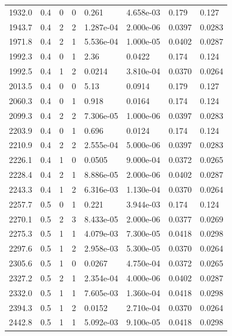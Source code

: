 \documentclass[preview]{standalone}
\begin{document}
{{{\begin{tabular}{L{1.2cm}C{1.2cm} C{0.3cm}C{0.5cm} C{1.4cm}C{1.4cm} C{1.4cm}C{1.4cm}}
  1932.0  &   0.4  & 0     &  0 &  0.261  & 4.658e-03  & 0.179 &  0.127   \\ 
  1943.7  &   0.4  & 2     &  2 &  1.287e-04  & 2.000e-06  & 0.0397 &  0.0283   \\ 
  1971.8  &   0.4  & 2     &  1 &  5.536e-04  & 1.000e-05  & 0.0402 &  0.0287   \\ 
  1992.3  &   0.4  & 0     &  1 &  2.36  & 0.0422  & 0.174 &  0.124   \\ 
  1992.5  &   0.4  & 1     &  2 &  0.0214  & 3.810e-04  & 0.0370 &  0.0264   \\ 
  2013.5  &   0.4  & 0     &  0 &  5.13  & 0.0914  & 0.179 &  0.127   \\ 
  2060.3  &   0.4  & 0     &  1 &  0.918  & 0.0164  & 0.174 &  0.124   \\ 
  2099.3  &   0.4  & 2     &  2 &  7.306e-05  & 1.000e-06  & 0.0397 &  0.0283   \\ 
  2203.9  &   0.4  & 0     &  1 &  0.696  & 0.0124  & 0.174 &  0.124   \\ 
  2210.9  &   0.4  & 2     &  2 &  2.555e-04  & 5.000e-06  & 0.0397 &  0.0283   \\ 
  2226.1  &   0.4  & 1     &  0 &  0.0505  & 9.000e-04  & 0.0372 &  0.0265   \\ 
  2228.4  &   0.4  & 2     &  1 &  8.886e-05  & 2.000e-06  & 0.0402 &  0.0287   \\ 
  2243.3  &   0.4  & 1     &  2 &  6.316e-03  & 1.130e-04  & 0.0370 &  0.0264   \\ 
  2257.7  &   0.5  & 0     &  1 &  0.221  & 3.944e-03  & 0.174 &  0.124   \\ 
  2270.1  &   0.5  & 2     &  3 &  8.433e-05  & 2.000e-06  & 0.0377 &  0.0269   \\ 
  2275.3  &   0.5  & 1     &  1 &  4.079e-03  & 7.300e-05  & 0.0418 &  0.0298   \\ 
  2297.6  &   0.5  & 1     &  2 &  2.958e-03  & 5.300e-05  & 0.0370 &  0.0264   \\ 
  2305.6  &   0.5  & 1     &  0 &  0.0267  & 4.750e-04  & 0.0372 &  0.0265   \\ 
  2327.2  &   0.5  & 2     &  1 &  2.354e-04  & 4.000e-06  & 0.0402 &  0.0287   \\ 
  2332.0  &   0.5  & 1     &  1 &  7.605e-03  & 1.360e-04  & 0.0418 &  0.0298   \\ 
  2394.3  &   0.5  & 1     &  2 &  0.0152  & 2.710e-04  & 0.0370 &  0.0264   \\ 
  2442.8  &   0.5  & 1     &  1 &  5.092e-03  & 9.100e-05  & 0.0418 &  0.0298   \\ 

\end{tabular}}}}
\end{document}

